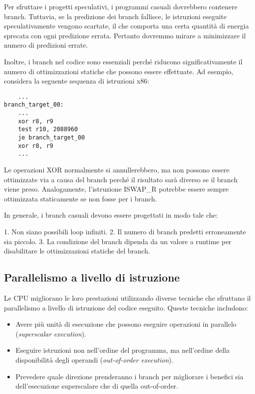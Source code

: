 Per sfruttare i progetti speculativi, i programmi casuali dovrebbero contenere branch. Tuttavia, se la predizione dei branch fallisce, le istruzioni eseguite speculativamente vengono scartate, il che comporta una certa quantità di energia sprecata con ogni predizione errata. Pertanto dovremmo mirare a minimizzare il numero di predizioni errate.

Inoltre, i branch nel codice sono essenziali perché riducono significativamente il numero di ottimizzazioni statiche che possono essere effettuate. Ad esempio, considera la seguente sequenza di istruzioni x86:
\begin{verbatim}
    ...
branch_target_00:
    ...
    xor r8, r9
    test r10, 2088960
    je branch_target_00
    xor r8, r9
    ...
\end{verbatim}
Le operazioni XOR normalmente si annullerebbero, ma non possono essere ottimizzate via a causa del branch perché il risultato sarà diverso se il branch viene preso. Analogamente, l'istruzione ISWAP\_R potrebbe essere sempre ottimizzata staticamente se non fosse per i branch.

In generale, i branch casuali devono essere progettati in modo tale che:

1. Non siano possibili loop infiniti.
2. Il numero di branch predetti erroneamente sia piccolo.
3. La condizione del branch dipenda da un valore a runtime per disabilitare le ottimizzazioni statiche del branch.

\subsection{Parallelismo a livello di istruzione}

Le CPU migliorano le loro prestazioni utilizzando diverse tecniche che sfruttano il parallelismo a livello di istruzione del codice eseguito. Queste tecniche includono:

\begin{itemize}
  \item Avere più unità di esecuzione che possono eseguire operazioni in parallelo (\textit{superscalar execution}).
  \item Eseguire istruzioni non nell'ordine del programma, ma nell'ordine della disponibilità degli operandi (\textit{out-of-order execution}).
  \item Prevedere quale direzione prenderanno i branch per migliorare i benefici sia dell'esecuzione superscalare che di quella out-of-order.
\end{itemize}

